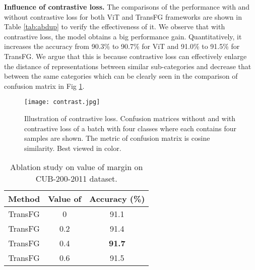 \noindent \textbf{Influence of contrastive loss.} The comparisons of the performance with and without contrastive loss for both ViT and TransFG frameworks are shown in Table \ref{tab:abdup} to verify the effectiveness of it. We observe that with contrastive loss, the model obtains a big performance gain. Quantitatively, it increases the accuracy from 90.3\% to 90.7\% for ViT and 91.0\% to 91.5\% for TransFG. We argue that this is because contrastive loss can effectively enlarge the distance of representations between similar sub-categories and decrease that between the same categories which can be clearly seen in the comparison of confusion matrix in Fig \ref{fig:confusion}.

\begin{figure}[h]
    \centering
    \texttt{[image: contrast.jpg]}
    \caption{Illustration of contrastive loss. Confusion matrices without and with contrastive loss of a batch with four classes where each contains four samples are shown. The metric of confusion matrix is cosine similarity. Best viewed in color.}
    \label{fig:confusion}
\end{figure}

\begin{table}[]
    \small
    \centering
    \caption{Ablation study on value of margin  on CUB-200-2011 dataset.}
    \label{tab:abalpha}
    \begin{tabular}{|c|c|c|}
    \hline
    Method & Value of  & Accuracy (\%) \\ \hline
    TransFG & 0 & 91.1 \\ 
    TransFG & 0.2 & 91.4 \\ 
    TransFG & 0.4 & \textbf{91.7} \\ 
    TransFG & 0.6 & 91.5 \\ \hline
    \end{tabular}
\end{table}

